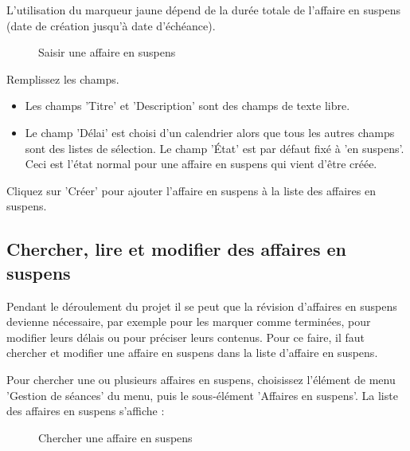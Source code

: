L'utilisation du marqueur jaune dépend de la durée totale de l'affaire en suspens (date de création jusqu'à date d'échéance).

\begin{figure}[H]
\caption{Saisir une affaire en suspens}
\end{figure}

Remplissez les champs.

\begin{itemize}
\item
Les champs 'Titre'  et 'Description'  sont des champs de texte libre.
\item
Le champ 'Délai'  est choisi d'un calendrier alors que tous les autres champs  sont des listes de sélection. Le champ 'État' est par défaut fixé à 'en suspens'. Ceci est l'état normal pour une affaire en suspens qui vient d'être créée.
\end{itemize}
Cliquez sur 'Créer'  pour ajouter l'affaire en suspens à la liste des affaires en suspens.

\subsection{Chercher, lire et modifier des affaires en suspens}
Pendant le déroulement du projet il se peut que la révision d'affaires en suspens devienne nécessaire, par exemple pour les marquer comme terminées, pour modifier leurs délais ou pour préciser leurs contenus. Pour ce faire, il faut chercher et modifier une affaire en suspens dans la liste d'affaire en suspens.

\vspace{\baselineskip}

Pour chercher une ou plusieurs affaires en suspens, choisissez l'élément de menu 'Gestion de séances' du menu, puis le sous-élément 'Affaires en suspens'. La liste des affaires en suspens s'affiche :

\begin{figure}[H]
\caption{Chercher une affaire en suspens}
\end{figure}

